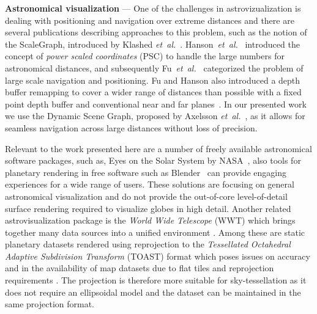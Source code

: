 \documentclass[journal]{vgtc}                %
\newcommand{\etal}{\emph{et~al.}}
\begin{document}
\noindent\textbf{Astronomical visualization} ---
One of the challenges in astrovizualization is dealing with positioning and navigation over extreme distances and there are several publications describing approaches to this problem, such as the notion of the ScaleGraph, introduced by Klashed \etal~\cite{KHECY10}.
Hanson~\etal~\cite{hanson2000very} introduced the concept of \emph{power scaled coordinates} (PSC) to handle the large numbers for astronomical distances, and subsequently Fu~\etal~\cite{fu2006navigation} categorized the problem of large scale navigation and positioning. Fu and Hanson also introduced a depth buffer remapping to cover a wider range of distances than possible with a fixed point depth buffer and conventional near and far planes~\cite{fu2007transparently}.
In our presented work we use the Dynamic Scene Graph, proposed by Axelsson \etal~\cite{Axelsson2017Dynamic}, as it allows for seamless navigation across large distances without loss of precision.

Relevant to the work presented here are a number of freely available astronomical software packages, such as, Eyes on the Solar System by NASA~\cite{hussey2010eyes}, also tools for planetary rendering in free software such as Blender~\cite{kent2013visualizing, naiman2016astroblend} can provide engaging experiences for a wide range of users. These solutions are focusing on general astronomical visualization and do not provide the out-of-core level-of-detail surface rendering required to visualize globes in high detail.
Another related astrovisualization package is the \emph{World Wide Telescope} (WWT) which brings together many data sources into a unified environment \cite{ali2011online, goodman2012worldwide}.
Among these are static planetary datasets rendered using reprojection to the \emph{Tessellated Octahedral Adaptive Subdivision Transform} (TOAST) format which poses issues on accuracy and in the availability of map datasets due to flat tiles and reprojection requirements \cite{berriman2017application}. The projection is therefore more suitable for sky-tessellation as it does not require an ellipsoidal model and the dataset can be maintained in the same projection format.
\end{document}

